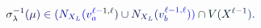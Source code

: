 \documentclass[12pt]{article}
\begin{document}
\makeatletter
\renewcommand*{\@textcolor}[3]{%
  \protect\leavevmode
  \begingroup
    \color#1{#2}#3%
  \endgroup
}
\makeatother
\begin{displaymath}
\mathcolor[RGB]{0,0,15}{\sigma} _ { \mathcolor[RGB]{0,0,30}{\lambda} } ^ { \mathcolor[RGB]{0,0,45}{-} \mathcolor[RGB]{0,0,60}{1} } \mathcolor[RGB]{0,0,75}{(} \mathcolor[RGB]{0,0,90}{\mu} \mathcolor[RGB]{0,0,105}{)} \mathcolor[RGB]{0,0,120}{\in} \mathcolor[RGB]{0,0,135}{(} \mathcolor[RGB]{0,0,150}{N} _ { \mathcolor[RGB]{0,0,165}{X} _ { \mathcolor[RGB]{0,0,180}{L} } } \mathcolor[RGB]{0,0,195}{(} \mathcolor[RGB]{0,0,210}{v} _ { \mathcolor[RGB]{0,0,225}{a} } ^ { \mathcolor[RGB]{0,0,240}{\ell} \mathcolor[RGB]{0,0,255}{-} \mathcolor[RGB]{0,15,0}{1} \mathcolor[RGB]{0,15,15}{,} \mathcolor[RGB]{0,15,30}{\ell} } \mathcolor[RGB]{0,15,45}{)} \mathcolor[RGB]{0,15,60}{\cup} \mathcolor[RGB]{0,15,75}{N} _ { \mathcolor[RGB]{0,15,90}{X} _ { \mathcolor[RGB]{0,15,105}{L} } } \mathcolor[RGB]{0,15,120}{(} \mathcolor[RGB]{0,15,135}{v} _ { \mathcolor[RGB]{0,15,150}{b} } ^ { \mathcolor[RGB]{0,15,165}{\ell} \mathcolor[RGB]{0,15,180}{-} \mathcolor[RGB]{0,15,195}{1} \mathcolor[RGB]{0,15,210}{,} \mathcolor[RGB]{0,15,225}{\ell} } \mathcolor[RGB]{0,15,240}{)} \mathcolor[RGB]{0,15,255}{)} \mathcolor[RGB]{0,30,0}{\cap} \mathcolor[RGB]{0,30,15}{V} \mathcolor[RGB]{0,30,30}{(} \mathcolor[RGB]{0,30,45}{X} ^ { \mathcolor[RGB]{0,30,60}{\ell} \mathcolor[RGB]{0,30,75}{-} \mathcolor[RGB]{0,30,90}{1} } \mathcolor[RGB]{0,30,105}{)} \mathcolor[RGB]{0,30,120}{.}
\end{displaymath}
\end{document}
